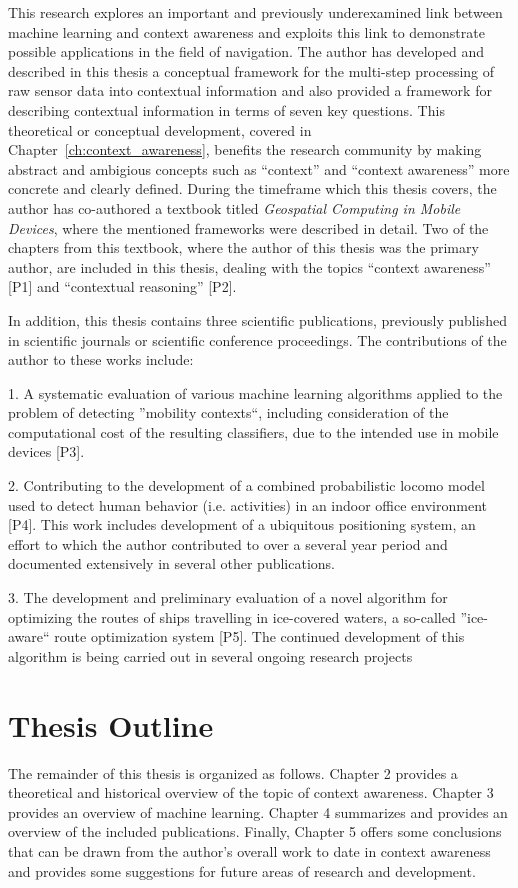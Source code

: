 This research explores an important and previously underexamined link between machine learning and context awareness and exploits this link to demonstrate possible applications in the field of navigation. The author has developed and described in this thesis a conceptual framework for the multi-step processing of raw sensor data into contextual information and also provided a framework for describing contextual information in terms of seven key questions. This theoretical or conceptual development, covered in Chapter~\ref{ch:context_awareness}, benefits the research community by making abstract and ambigious concepts such as ``context'' and ``context awareness'' more concrete and clearly defined. During the timeframe which this thesis covers, the author has co-authored a textbook titled \emph{Geospatial Computing in Mobile Devices}, where the mentioned frameworks were described in detail. Two of the chapters from this textbook, where the author of this thesis was the primary author, are included in this thesis, dealing with the topics ``context awareness'' [P1] and ``contextual reasoning'' [P2].

In addition, this thesis contains three scientific publications, previously published in scientific journals or scientific conference proceedings. The contributions of the author to these works include:

1. A systematic evaluation of various machine learning algorithms applied to the problem of detecting ''mobility contexts``, including consideration of the computational cost of the resulting classifiers, due to the intended use in mobile devices [P3].

2. Contributing to the development of a combined probabilistic \gls{locomo} model used to detect human behavior (i.e. activities) in an indoor office environment [P4]. This work includes development of a ubiquitous positioning system, an effort to which the author contributed to over a several year period and documented extensively in several other publications.

3. The development and preliminary evaluation of a novel algorithm for optimizing the routes of ships travelling in ice-covered waters, a so-called ''ice-aware`` route optimization system [P5]. The continued development of this algorithm is being carried out in several ongoing research projects

\section{Thesis Outline}
\label{sec:outline}
 
The remainder of this thesis is organized as follows. Chapter 2 provides a theoretical and historical overview of the topic of context awareness. Chapter 3 provides an overview of machine learning. Chapter 4 summarizes and provides an overview of the included publications. Finally, Chapter 5 offers some conclusions that can be drawn from the author's overall work to date in context awareness and provides some suggestions for future areas of research and development.